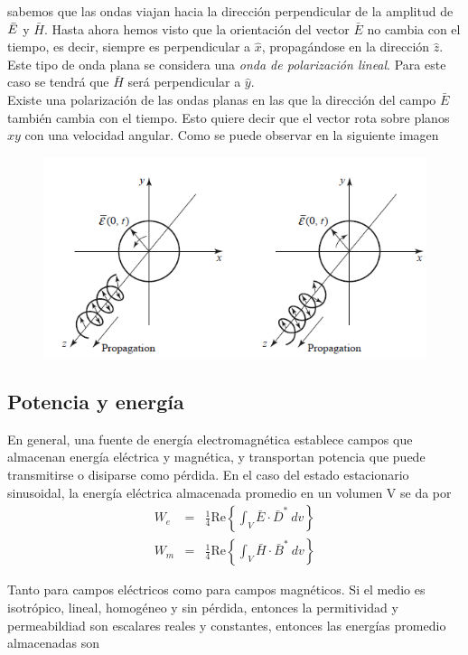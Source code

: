sabemos que las ondas viajan hacia la dirección perpendicular de la amplitud de $\Bar{E}$ y $\bar{H}$. Hasta ahora hemos visto que la orientación del vector $\bar{E}$ no cambia con el tiempo, es decir, siempre es perpendicular a $\hat{x}$, propagándose en la dirección $\hat{z}$. Este tipo de onda plana se considera una \textit{onda de polarización lineal}. Para este caso se tendrá que $\bar{H}$ será perpendicular a $\hat{y}$. \\

Existe una polarización de las ondas planas en las que la dirección del campo $\bar{E}$ también cambia con el tiempo. Esto quiere decir que el vector rota sobre planos $xy$ con una velocidad angular. Como se puede observar en la siguiente imagen

\begin{figure}[H]
    \centering
    \includegraphics[scale=0.6]{Waves/wave_f9.png}
\end{figure}

\subsection{Potencia y energía}

En general, una fuente de energía electromagnética establece campos que almacenan energía eléctrica y magnética, y transportan potencia que puede transmitirse o disiparse como pérdida. En el caso del estado estacionario sinusoidal, la energía eléctrica almacenada promedio en un volumen V se da por
 \begin{eqnarray*}
W_e &=& \frac{1}{4} \text{Re} \left\{ \int_V \bar{E} \cdot \bar{D}^* \ d v \right\} \\
W_m &=& \frac{1}{4} \text{Re} \left\{ \int_V \bar{H} \cdot \bar{B}^* \ d v \right\} 
 \end{eqnarray*}

Tanto para campos eléctricos como para campos magnéticos. Si el medio es isotrópico, lineal, homogéneo y sin pérdida, entonces la permitividad y permeabildiad son escalares reales y constantes, entonces las energías promedio almacenadas son

